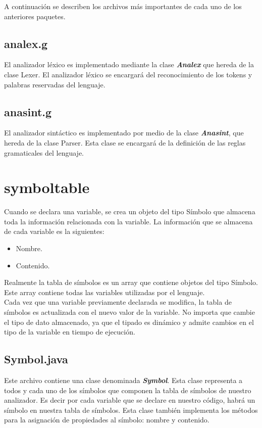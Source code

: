    A continuación se describen los archivos más importantes de cada uno de los anteriores paquetes.\\

      \subsection{analex.g}
      El analizador léxico es implementado mediante la clase \textbf{\textit{Analex}} que hereda de la clase Lexer. El analizador léxico 
      se encargará del reconocimiento de los tokens y palabras reservadas del lenguaje.\\

      \subsection{anasint.g}
      El analizador sintáctico es implementado por medio de la clase \textbf{\textit{Anasint}}, que hereda de la clase Parser. Esta clase
      se encargará de la definición de las reglas gramaticales del lenguaje.
      

   \section{symboltable}
   Cuando se declara una variable, se crea un objeto del tipo Símbolo que almacena toda la información relacionada con la variable. La 
   información que se almacena de cada variable es la siguientes: 
   \begin{itemize}
      \item Nombre.
      \item Contenido.\\
   \end{itemize}
   Realmente la tabla de símbolos es un array que contiene objetos del tipo Símbolo. Este array contiene todas las variables utilizadas 
   por el lenguaje.\\

   Cada vez que una variable previamente declarada se modifica, la tabla de símbolos es actualizada con el nuevo valor de la variable. No
   importa que cambie el tipo de dato almacenado, ya que el tipado es dinámico y admite cambios en el tipo de la variable en tiempo de ejecución.\\

      \subsection{Symbol.java}
      Este archivo contiene una clase denominada \textbf{\textit{Symbol}}. Esta clase representa a todos y cada uno de los símbolos que  
      componen la tabla de símbolos de nuestro analizador. Es decir por cada variable que se declare en nuestro código, habrá un símbolo
      en nuestra tabla de símbolos. Esta clase también implementa los métodos para la asignación de propiedades al símbolo: nombre y contenido. 

